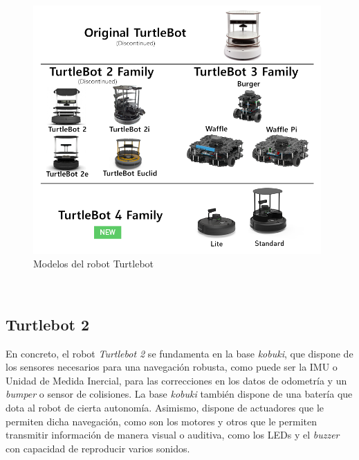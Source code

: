 \begin{figure} [h!]
  \begin{center}
    \includegraphics[width=11cm]{figs/turtlebot_family}
  \end{center}
  \caption{Modelos del robot Turtlebot \cite{turtlebot4}}
  \label{fig:turtlebots}
\end{figure}\


\subsection{Turtlebot 2}
\label{sec:turtlebot2}

En concreto, el robot \textit{Turtlebot 2} se fundamenta en la base
\textit{kobuki}, que dispone de los sensores necesarios para una navegación
robusta, como puede ser la IMU o Unidad de Medida Inercial, para las
correcciones en los datos de odometría y un \textit{bumper} o sensor de
colisiones.
La base \textit{kobuki} también dispone de una batería que dota al robot de
cierta autonomía.
Asimismo, dispone de actuadores que le permiten dicha navegación, como son los
motores y otros que le permiten transmitir información de manera visual o
auditiva, como los LEDs y el \textit{buzzer} con capacidad de reproducir varios
sonidos.

